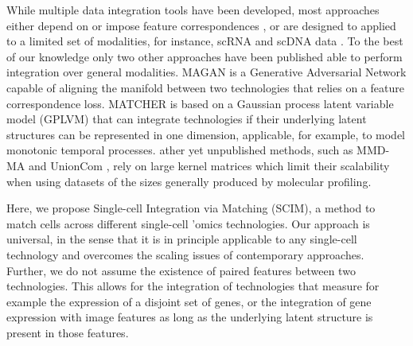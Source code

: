 While multiple data integration tools have been developed, most approaches either depend on or impose feature correspondences \cite{stuart2019,welch2019}, or are designed to applied to a limited set of modalities, for instance, scRNA and scDNA data \cite{campbell2019,mccarthy2020}.
To the best of our knowledge only two other approaches have been published \cite{amodio2018,welch2017} able to perform integration over general modalities.
MAGAN \cite{amodio2018} is a Generative Adversarial Network capable of aligning the manifold between two technologies that relies on a feature correspondence loss.
MATCHER \cite{welch2017} is based on a Gaussian process latent variable model (GPLVM) \cite{lawrence2004} that can integrate technologies if their underlying latent structures can be represented in one dimension, applicable, for example, to model monotonic temporal processes.
ather yet unpublished methods, such as MMD-MA \cite{liu2019} and UnionCom \cite{cao2020}, rely on large kernel matrices which limit their scalability when using datasets of the sizes generally produced by molecular profiling.

Here, we propose Single-cell Integration via Matching (SCIM), a method to match cells across different single-cell ’omics technologies.
Our approach is universal, in the sense that it is in principle applicable to any single-cell technology and overcomes the scaling issues of contemporary approaches.
Further, we do not assume the existence of paired features between two technologies.
This allows for the integration of technologies that measure for example the expression of a disjoint set of genes, or the integration of gene expression with image features as long as the underlying latent structure is present in those features.
